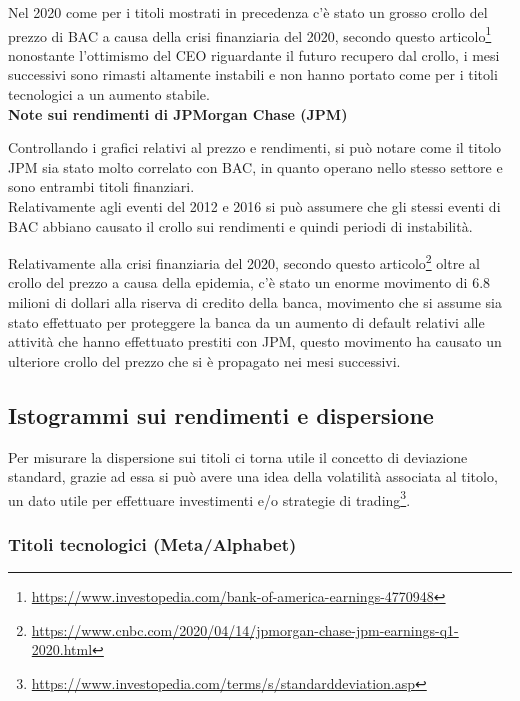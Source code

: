 \documentclass{article}
\begin{document}
Nel 2020 come per i titoli mostrati in precedenza c'è stato un grosso crollo del prezzo di BAC a causa della crisi finanziaria del 2020, secondo questo 
articolo\footnote{
  \href{https://www.investopedia.com/bank-of-america-earnings-4770948}{https://www.investopedia.com/bank-of-america-earnings-4770948}
}
nonostante l'ottimismo del CEO riguardante il futuro recupero dal crollo, i mesi successivi sono rimasti altamente instabili e non hanno portato come per i titoli tecnologici
a un aumento stabile.\\

\textbf{Note sui rendimenti di JPMorgan Chase (JPM)}

Controllando i grafici relativi al prezzo e rendimenti, si può notare come il titolo JPM sia stato molto correlato con BAC, in quanto operano nello stesso settore e sono entrambi
titoli finanziari.\\
Relativamente agli eventi del 2012 e 2016 si può assumere che gli stessi eventi di BAC abbiano causato il crollo sui rendimenti e quindi periodi di instabilità.

Relativamente alla crisi finanziaria del 2020, secondo questo
articolo\footnote{
  \href{https://www.cnbc.com/2020/04/14/jpmorgan-chase-jpm-earnings-q1-2020.html}{https://www.cnbc.com/2020/04/14/jpmorgan-chase-jpm-earnings-q1-2020.html}
}
oltre al crollo del prezzo a causa della epidemia, c'è stato un enorme movimento di 6.8 milioni di dollari alla riserva di credito della banca, movimento che si assume sia stato effettuato
per proteggere la banca da un aumento di default relativi alle attività che hanno effettuato prestiti con JPM, questo movimento ha causato un ulteriore crollo del prezzo che si è propagato nei mesi successivi.

\pagebreak

\subsection{Istogrammi sui rendimenti e dispersione}

Per misurare la dispersione sui titoli ci torna utile il concetto di deviazione standard, grazie ad essa si può avere una idea della
 volatilità associata al titolo, un dato utile per effettuare investimenti e/o strategie di 
trading\footnote{
  \href{https://www.investopedia.com/terms/s/standarddeviation.asp}{https://www.investopedia.com/terms/s/standarddeviation.asp}
}.\\

\subsubsection{Titoli tecnologici (Meta/Alphabet)}
\end{document}
